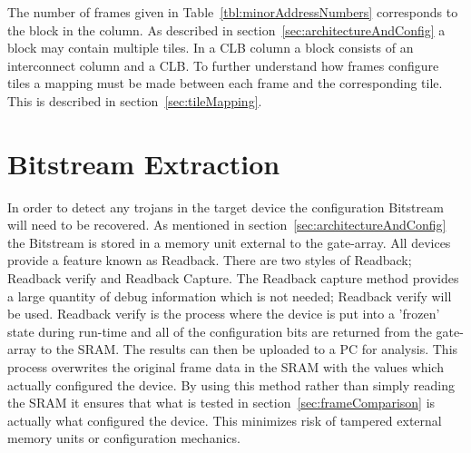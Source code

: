 The number of frames given in Table~\ref{tbl:minorAddressNumbers} corresponds to the block in the column.
As described in section~\ref{sec:architectureAndConfig} a block may contain multiple tiles.
In a CLB column a block consists of an interconnect column and a \acrshort{CLB}.
To further understand how frames configure tiles a mapping must be made between each frame and the corresponding tile.
This is described in section~\ref{sec:tileMapping}.
 
\section{\gls{Bitstream} Extraction} \label{sec:bitstreamExtraction}
In order to detect any trojans in the \gls{target} device the configuration \gls{Bitstream} will need to be recovered.
As mentioned in section~\ref{sec:architectureAndConfig} the \gls{Bitstream} is stored in a memory unit external to the gate-array.
All \Xilinx devices provide a feature known as \gls{Readback}.
There are two styles of \gls{Readback}; \gls{Readback} verify and \gls{Readback} Capture.
The \gls{Readback} capture method provides a large quantity of debug information which is not needed; \gls{Readback} verify will be used.
\gls{Readback} verify is the process where the device is put into a 'frozen' state during run-time and all of the configuration bits are returned from the gate-array to the \acrshort{SRAM}. 
The results can then be uploaded to a \acrfull{PC} for analysis.
This process overwrites the original frame data in the \acrshort{SRAM} with the values which actually configured the device. 
By using this method rather than simply reading the \acrshort{SRAM} it ensures that what is tested in section~\ref{sec:frameComparison} is actually what configured the device.
This minimizes risk of tampered external memory units or configuration mechanics. 
